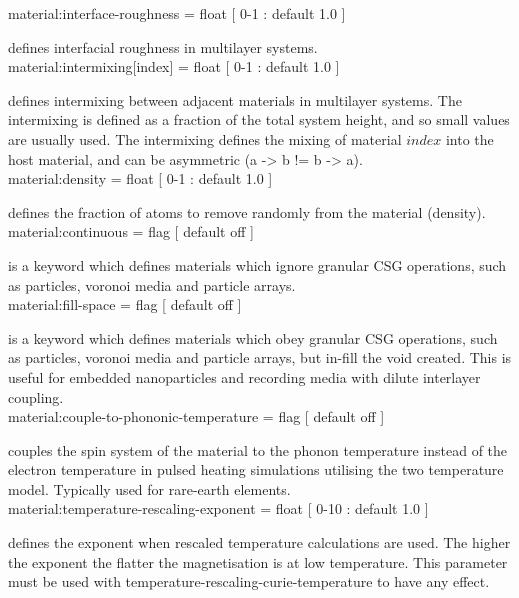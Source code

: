 {\zicf material:interface-roughness = float [ 0-1 : default 1.0 ]} defines interfacial roughness in multilayer systems.\\

{\zicf material:intermixing[index] = float [ 0-1 : default 1.0 ]} defines intermixing between adjacent materials in multilayer systems. The intermixing is defined as a fraction of the total system height, and so small values are usually used. The intermixing defines the mixing of material $index$ into the host material, and can be asymmetric (a -> b != b -> a).\\

{\zicf material:density = float [ 0-1 : default 1.0 ]} defines the fraction of atoms to remove randomly from the material (density).\\

{\zicf material:continuous = flag [ default off ]} is a keyword which defines materials which ignore granular CSG operations, such as particles, voronoi media and particle arrays.\\

{\zicf material:fill-space = flag [ default off ]} is a keyword which defines materials which obey granular CSG operations, such as particles, voronoi media and particle arrays, but in-fill the void created. This is useful for embedded nanoparticles and recording media with dilute interlayer coupling.\\

{\zicf material:couple-to-phononic-temperature = flag [ default off ]} couples the spin system of the material to the phonon temperature instead of the electron temperature in pulsed heating simulations utilising the two temperature model. Typically used for rare-earth elements.\\

{\zicf material:temperature-rescaling-exponent = float [ 0-10 : default 1.0 ]} defines the exponent when rescaled temperature calculations are used. The higher the exponent the flatter the magnetisation is at low temperature. This parameter must be used with temperature-rescaling-curie-temperature to have any effect.\\

